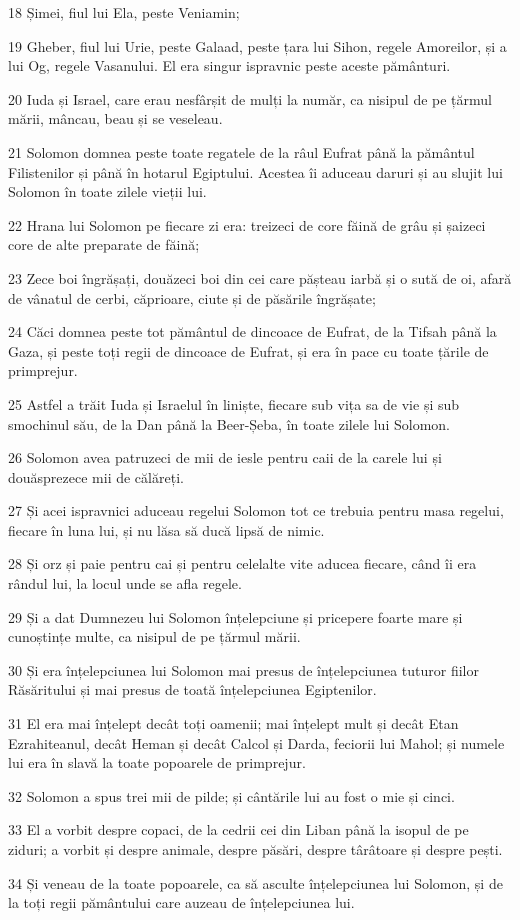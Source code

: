\par 18 Șimei, fiul lui Ela, peste Veniamin;
\par 19 Gheber, fiul lui Urie, peste Galaad, peste țara lui Sihon, regele Amoreilor, și a lui Og, regele Vasanului. El era singur ispravnic peste aceste pământuri.
\par 20 Iuda și Israel, care erau nesfârșit de mulți la număr, ca nisipul de pe țărmul mării, mâncau, beau și se veseleau.
\par 21 Solomon domnea peste toate regatele de la râul Eufrat până la pământul Filistenilor și până în hotarul Egiptului. Acestea îi aduceau daruri și au slujit lui Solomon în toate zilele vieții lui.
\par 22 Hrana lui Solomon pe fiecare zi era: treizeci de core făină de grâu și șaizeci core de alte preparate de făină;
\par 23 Zece boi îngrășați, douăzeci boi din cei care pășteau iarbă și o sută de oi, afară de vânatul de cerbi, căprioare, ciute și de păsările îngrășate;
\par 24 Căci domnea peste tot pământul de dincoace de Eufrat, de la Tifsah până la Gaza, și peste toți regii de dincoace de Eufrat, și era în pace cu toate țările de primprejur.
\par 25 Astfel a trăit Iuda și Israelul în liniște, fiecare sub vița sa de vie și sub smochinul său, de la Dan până la Beer-Șeba, în toate zilele lui Solomon.
\par 26 Solomon avea patruzeci de mii de iesle pentru caii de la carele lui și douăsprezece mii de călăreți.
\par 27 Și acei ispravnici aduceau regelui Solomon tot ce trebuia pentru masa regelui, fiecare în luna lui, și nu lăsa să ducă lipsă de nimic.
\par 28 Și orz și paie pentru cai și pentru celelalte vite aducea fiecare, când îi era rândul lui, la locul unde se afla regele.
\par 29 Și a dat Dumnezeu lui Solomon înțelepciune și pricepere foarte mare și cunoștințe multe, ca nisipul de pe țărmul mării.
\par 30 Și era înțelepciunea lui Solomon mai presus de înțelepciunea tuturor fiilor Răsăritului și mai presus de toată înțelepciunea Egiptenilor.
\par 31 El era mai înțelept decât toți oamenii; mai înțelept mult și decât Etan Ezrahiteanul, decât Heman și decât Calcol și Darda, feciorii lui Mahol; și numele lui era în slavă la toate popoarele de primprejur.
\par 32 Solomon a spus trei mii de pilde; și cântările lui au fost o mie și cinci.
\par 33 El a vorbit despre copaci, de la cedrii cei din Liban până la isopul de pe ziduri; a vorbit și despre animale, despre păsări, despre târâtoare și despre pești.
\par 34 Și veneau de la toate popoarele, ca să asculte înțelepciunea lui Solomon, și de la toți regii pământului care auzeau de înțelepciunea lui.

